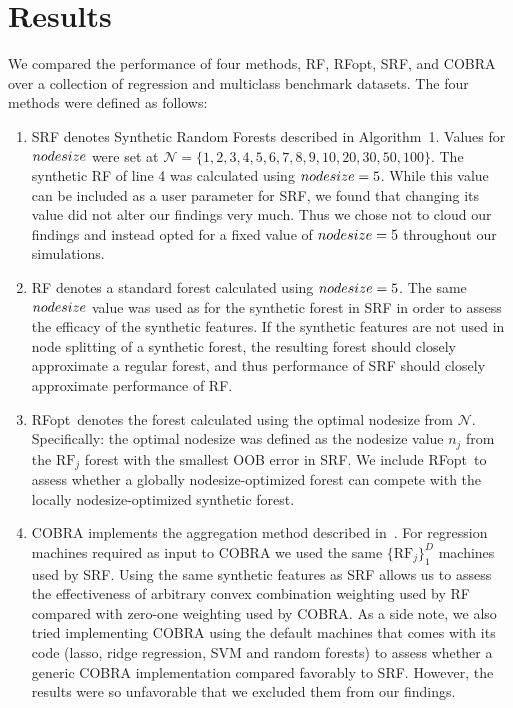 \documentclass{bmcart}
\def\nodesize{{\sl nodesize }}
\def\RF{\textrm{RF}}
\def\RFopt{RFopt}
\def\RSFS{\mathscr}
\def\nn{{\RSFS N}}
\begin{document}
\section*{Results}

We compared the performance of four methods, RF, \RFopt, SRF, and COBRA
over a collection of regression and multiclass benchmark datasets.
The four methods were defined as follows:

\begin{enumerate}
\item

SRF denotes Synthetic Random Forests described in Algorithm~1.  Values
for $\nodesize$ were set at
$\nn=\{1,2,3,4,5,6,7,8,9,10,20,30,50,100\}$.  The synthetic RF of line
4 was calculated using $\nodesize=5$.  While this value can be
included as a user parameter for SRF, we found that changing its value
did not alter our findings very much.  Thus we chose not to cloud our
findings and instead opted for a fixed value of $\nodesize=5$ throughout our
simulations.
\item
RF denotes a standard forest calculated using $\nodesize=5$.  The same
$\nodesize$ value was used as for the synthetic forest in SRF in order to
assess the efficacy of the synthetic features.  If the synthetic
features are not used in node splitting of a synthetic forest, the
resulting forest should closely approximate a regular forest, and thus
performance of SRF should closely approximate performance of RF.
\item
\RFopt\, denotes the forest calculated using the optimal nodesize from
$\nn$.  Specifically: the optimal nodesize was defined as the nodesize
value $n_j$ from the $\RF_j$ forest with the smallest OOB error in
SRF.  We include \RFopt\ to assess whether a globally nodesize-optimized
forest can compete with the locally nodesize-optimized synthetic
forest.
\item
COBRA implements the aggregation method described in~\cite{biau:2013}.
For regression machines required as input to COBRA we used the same
$\{\RF_j\}_1^D$ machines used by SRF.  Using the same synthetic
features as SRF allows us to assess the effectiveness of arbitrary
convex combination weighting used by RF compared with zero-one
weighting used by COBRA.  As a side note, we also tried implementing
COBRA using the default machines that comes with its code (lasso,
ridge regression, SVM and random forests) to assess whether a generic
COBRA implementation compared favorably to SRF.  However, the results
were so unfavorable that we excluded them from our findings.
\end{enumerate}
\end{document}

